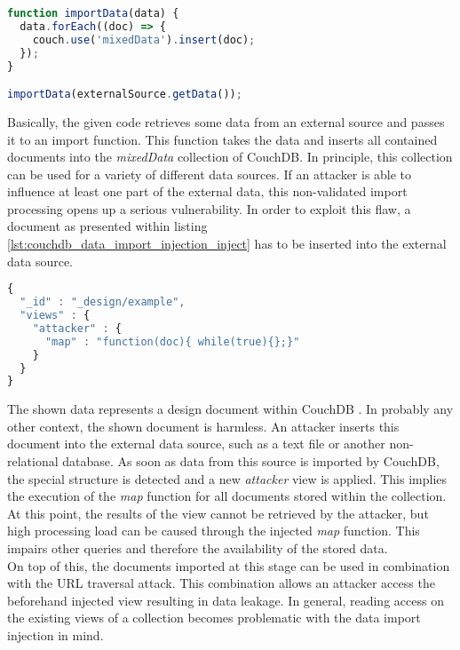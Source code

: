 \begin{lstlisting}[caption={Vulnerable NodeJS example for data import injection against CouchDB}, label={lst:couchdb_data_import_injection_app}, language=JavaScript]
function importData(data) {
  data.forEach((doc) => {
    couch.use('mixedData').insert(doc);
  });
}

importData(externalSource.getData());
\end{lstlisting}

Basically, the given code retrieves some data from an external source and passes it to an import function. This function takes the data and inserts all contained documents into the \emph{mixedData} collection of CouchDB. In principle, this collection can be used for a variety of different data sources. If an attacker is able to influence at least one part of the external data, this non-validated import processing opens up a serious vulnerability. In order to exploit this flaw, a document as presented within listing \ref{lst:couchdb_data_import_injection_inject} has to be inserted into the external data source. \\

\begin{lstlisting}[caption={Critical document for data import injection against CouchDB}, label={lst:couchdb_data_import_injection_inject}, language=JavaScript]
{
  "_id" : "_design/example",
  "views" : {
    "attacker" : {
      "map" : "function(doc){ while(true){};}"
    }
  }
}
\end{lstlisting}

The shown data represents a design document within CouchDB \cite{Anderson:2010b}. In probably any other context, the shown document is harmless. An attacker inserts this document into the external data source, such as a text file or another non-relational database. As soon as data from this source is imported by CouchDB, the special structure is detected and a new \emph{attacker} view is applied. This implies the execution of the \emph{map} function for all documents stored within the collection. At this point, the results of the view cannot be retrieved by the attacker, but high processing load can be caused through the injected \emph{map} function. This impairs other queries and therefore the availability of the stored data. \\

On top of this, the documents imported at this stage can be used in combination with the URL traversal attack. This combination allows an attacker access the beforehand injected view resulting in data leakage. In general, reading access on the existing views of a collection becomes problematic with the data import injection in mind. \\

